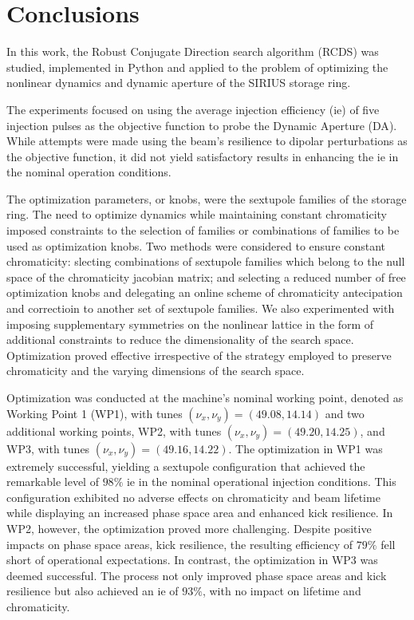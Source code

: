 \chapter{Conclusions}

In this work, the Robust Conjugate Direction search algorithm (\gls*{RCDS}) was studied, implemented in Python and applied to the problem of optimizing the nonlinear dynamics and dynamic aperture of the SIRIUS storage ring.

The experiments focused on using the average injection efficiency (\gls*{ie}) of five injection pulses as the objective function to probe the Dynamic Aperture (\gls*{DA}). While attempts were made using the beam's resilience to dipolar perturbations as the objective function, it did not yield satisfactory results in enhancing the \gls*{ie} in the nominal operation conditions.

The optimization parameters, or knobs, were the sextupole families of the storage ring. The need to optimize dynamics while maintaining constant chromaticity imposed constraints to the selection of families or combinations of families to be used as optimization knobs. Two methods were considered to ensure constant chromaticity: slecting combinations of sextupole families which belong to the null space of the chromaticity jacobian matrix; and selecting a reduced number of free optimization knobs and delegating an online scheme of chromaticity antecipation and correctioin to another set of sextupole families. We also experimented with imposing supplementary symmetries on the nonlinear lattice in the form of additional constraints to reduce the dimensionality of the search space. Optimization proved effective irrespective of the strategy employed to preserve chromaticity and the varying dimensions of the search space.

Optimization was conducted at the machine's nominal working point, denoted as Working Point 1 (\gls*{WP1}), with tunes $(\nu_x, \nu_y)=(49.08, 14.14)$ and two additional working points, \gls*{WP2}, with tunes $(\nu_x, \nu_y)=(49.20, 14.25)$, and \gls*{WP3}, with tunes $(\nu_x, \nu_y)=(49.16, 14.22)$. The optimization in WP1 was extremely successful, yielding a sextupole configuration that achieved the remarkable level of $98\%$ \gls*{ie} in the nominal operational injection conditions. This configuration exhibited no adverse effects on chromaticity and beam lifetime while displaying an increased phase space area and enhanced kick resilience. In \gls*{WP2}, however, the optimization proved more challenging. Despite positive impacts on phase space areas, kick resilience, the resulting efficiency of $79\%$ fell short of operational expectations. In contrast, the optimization in \gls{WP3} was deemed successful. The process not only improved phase space areas and kick resilience but also achieved an \gls*{ie} of $93\%$, with no impact on lifetime and chromaticity.

